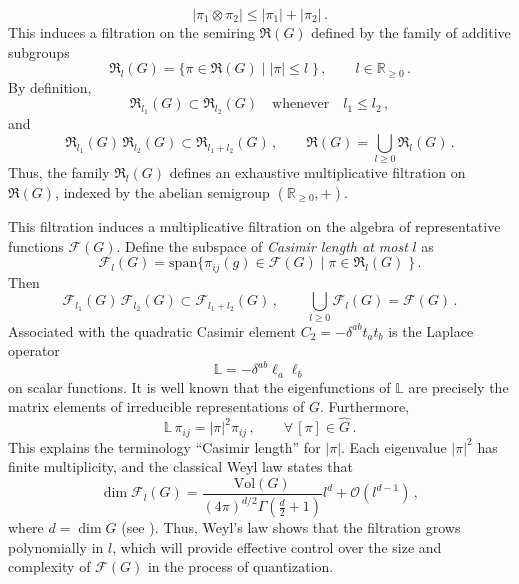 \documentclass[12pt,a4paper]{article}
\numberwithin{equation}{section}
\theoremstyle{theorem}
\theoremstyle{remark}
\newcommand{\fg}{\mathcal{F}(G)}
\begin{document}
\begin{equation}
    |\pi_1\otimes \pi_2|\leq |\pi_1|+|\pi_2|\,.
\end{equation}
This induces a filtration on the semiring $\mathfrak{R}(G)$ defined by the family of additive subgroups
\begin{equation}\label{t}
    \mathfrak{R}_l(G)=\big\{\pi \in \mathfrak{R}(G)\; \big|\;  |\pi|\leq l\;\big \}\,,\qquad l\in \mathbb{R}_{\geq 0}\,.
\end{equation}
By definition, 
$$
    \mathfrak{R}_{l_1}(G)\subset \mathfrak{R}_{l_2}(G)\quad \mbox{whenever}\quad l_1\leq l_2\,,
    $$
    and
    $$
    \mathfrak{R}_{l_1}(G)\,\mathfrak{R}_{l_2}(G)\subset \mathfrak{R}_{l_1+l_2}(G) \,,\qquad \mathfrak{R}(G)=\bigcup_{l \geq 0}\mathfrak{R}_l(G)\,.
    $$
Thus, the family $\mathfrak{R}_l(G)$ defines an exhaustive multiplicative filtration on $\mathfrak{R}(G)$, indexed by the abelian semigroup $(\mathbb{R}_{\geq 0}, +)$. 

This filtration induces a multiplicative filtration on the algebra of representative functions $\fg$. Define the subspace of {\it Casimir length at most} $l$ as 
\begin{equation}\label{FF}
    \mathcal{F}_l(G)=\mathrm{span} \big\{\pi_{ij}(g)\in \fg\;\big|\; \pi\in \mathfrak R_l(G)\;\big\}\,.
\end{equation}
Then 
$$
 \mathcal{F}_{l_1}(G) \,\mathcal{F}_{l_2}(G)\subset  \mathcal{F}_{l_1+l_2}(G)\,, \qquad \bigcup_{l\geq 0}\mathcal{F}_l(G)=\fg\,.
 $$
Associated with the quadratic Casimir element $C_2=-\delta^{ab}t_a t_b$ is the Laplace operator \begin{equation}
\mathbb{L}=-\delta^{ab}\ell_a\ell_b\end{equation}
on scalar functions.  It is well known that the eigenfunctions of $\mathbb{L}$ are precisely  the matrix elements of irreducible representations of $G$. Furthermore,
\begin{equation}
    \mathbb{L}\, \pi_{ij}=|\pi|^2\pi_{ij}\,,\qquad \forall\, [\pi] \in \hat G\,.
\end{equation}
This explains the terminology ``Casimir length'' for $|\pi|$. Each eigenvalue $|\pi|^2$ has finite multiplicity, and the classical Weyl law states that 
 \begin{equation}\label{WR}
     \dim \mathcal{F}_l(G)=\frac{\mathrm{Vol}(G) }{(4\pi)^{d/2}\Gamma(\frac d2+1)} l^d+\mathcal{O}(l^{d-1})\,,
 \end{equation}
where $d=\dim G$ (see \cite{Minakshisundaram_Pleijel_1949}). Thus, Weyl’s law shows that the filtration grows polynomially in $l$, which will provide effective control over the size and complexity of $\fg$ in the process of quantization.
\end{document}

